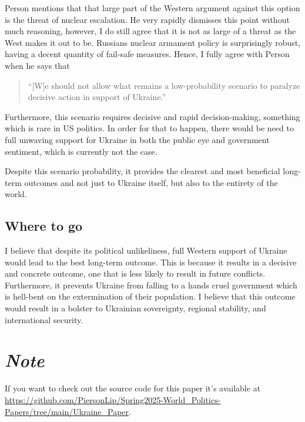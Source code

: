 \documentclass{article}
\begin{document}
        Person mentions that that large part of the Western argument against this option is the threat of nuclear escalation. He very rapidly dismisses this point without much reasoning, however, I do still agree that it is not as large of a threat as the West makes it out to be. Russians nuclear armament policy is surprisingly robust, having a decent quantity of fail-safe measures. Hence, I fully agree with Person when he says that 

        \begin{quote}
            ``[W]e should not allow what remains a low-probability scenario to paralyze decisive action in support of Ukraine.'' \parencite{person_2025}
        \end{quote}
        
        Furthermore, this scenario requires decisive and rapid decision-making, something which is rare in US politics. In order for that to happen, there would be need to full unwaving support for Ukraine in both the public eye and government sentiment, which is currently not the case. 

        Despite this scenario probability, it provides the clearest and most beneficial long-term outcomes and not just to Ukraine itself, but also to the entirety of the world. 
        
    \subsection{Where to go}
        I believe that despite its political unlikeliness, full Western support of Ukraine would lead to the best long-term outcome. This is because it results in a decisive and concrete outcome, one that is less likely to result in future conflicts. Furthermore, it prevents Ukraine from falling to a hands cruel government which is hell-bent on the extermination of their population. I believe that this outcome would result in a bolster to Ukrainian sovereignty, regional stability, and international security.

\section{\textit{Note}}
    If you want to check out the source code for this paper it's available at \href{https://github.com/PiersonLip/Spring2025-World_Politics-Papers/tree/main/Ukraine_Paper}{https://github.com/PiersonLip/Spring2025-World\_Politics-Papers/tree/main/Ukraine\_Paper}.

\printbibliography
\end{document}
